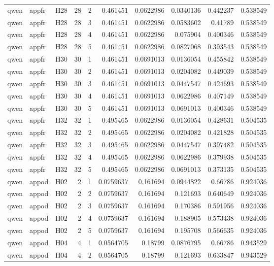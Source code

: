 \begin{longtable}{lllrrrrrrr}
qwen & appfr & H28 & 28 & 2 & 0.461451 & 0.0622986 & 0.0340136 & 0.442237 & 0.538549 \\
qwen & appfr & H28 & 28 & 3 & 0.461451 & 0.0622986 & 0.0583602 & 0.41789 & 0.538549 \\
qwen & appfr & H28 & 28 & 4 & 0.461451 & 0.0622986 & 0.075904 & 0.400346 & 0.538549 \\
qwen & appfr & H28 & 28 & 5 & 0.461451 & 0.0622986 & 0.0827068 & 0.393543 & 0.538549 \\
qwen & appfr & H30 & 30 & 1 & 0.461451 & 0.0691013 & 0.0136054 & 0.455842 & 0.538549 \\
qwen & appfr & H30 & 30 & 2 & 0.461451 & 0.0691013 & 0.0204082 & 0.449039 & 0.538549 \\
qwen & appfr & H30 & 30 & 3 & 0.461451 & 0.0691013 & 0.0447547 & 0.424693 & 0.538549 \\
qwen & appfr & H30 & 30 & 4 & 0.461451 & 0.0691013 & 0.0622986 & 0.407149 & 0.538549 \\
qwen & appfr & H30 & 30 & 5 & 0.461451 & 0.0691013 & 0.0691013 & 0.400346 & 0.538549 \\
qwen & appfr & H32 & 32 & 1 & 0.495465 & 0.0622986 & 0.0136054 & 0.428631 & 0.504535 \\
qwen & appfr & H32 & 32 & 2 & 0.495465 & 0.0622986 & 0.0204082 & 0.421828 & 0.504535 \\
qwen & appfr & H32 & 32 & 3 & 0.495465 & 0.0622986 & 0.0447547 & 0.397482 & 0.504535 \\
qwen & appfr & H32 & 32 & 4 & 0.495465 & 0.0622986 & 0.0622986 & 0.379938 & 0.504535 \\
qwen & appfr & H32 & 32 & 5 & 0.495465 & 0.0622986 & 0.0691013 & 0.373135 & 0.504535 \\
qwen & appod & H02 & 2 & 1 & 0.0759637 & 0.161694 & 0.0944822 & 0.66786 & 0.924036 \\
qwen & appod & H02 & 2 & 2 & 0.0759637 & 0.161694 & 0.121693 & 0.640649 & 0.924036 \\
qwen & appod & H02 & 2 & 3 & 0.0759637 & 0.161694 & 0.170386 & 0.591956 & 0.924036 \\
qwen & appod & H02 & 2 & 4 & 0.0759637 & 0.161694 & 0.188905 & 0.573438 & 0.924036 \\
qwen & appod & H02 & 2 & 5 & 0.0759637 & 0.161694 & 0.195708 & 0.566635 & 0.924036 \\
qwen & appod & H04 & 4 & 1 & 0.0564705 & 0.18799 & 0.0876795 & 0.66786 & 0.943529 \\
qwen & appod & H04 & 4 & 2 & 0.0564705 & 0.18799 & 0.121693 & 0.633847 & 0.943529 \\

\end{longtable}
